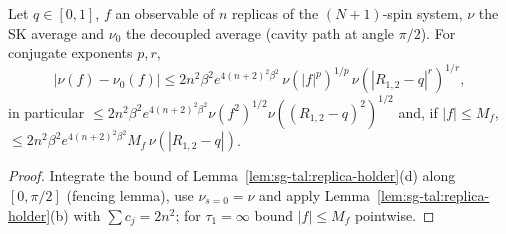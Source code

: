 \begin{theorem}
\label{thm:sg-tal:prop-181-first}
  \leanok
{}
Let $q\in[0,1]$, $f$ an observable of $n$ replicas of the $(N+1)$-spin system, $\nu$ the SK average and $\nu_0$ the decoupled average (cavity path at angle $\pi/2$).  For conjugate exponents $p,r$,
\[
|\nu(f)-\nu_0(f)|\le2n^2\beta^2e^{4(n+2)^2\beta^2}\,\nu(|f|^p)^{1/p}\,\nu(|R_{1,2}-q|^r)^{1/r},
\]
in particular $\le2n^2\beta^2e^{4(n+2)^2\beta^2}\nu(f^2)^{1/2}\nu((R_{1,2}-q)^2)^{1/2}$ and, if $|f|\le M_f$, $\le2n^2\beta^2e^{4(n+2)^2\beta^2}M_f\,\nu(|R_{1,2}-q|)$.
\end{theorem}
\begin{proof}
  \leanok
Integrate the bound of Lemma~\ref{lem:sg-tal:replica-holder}(d) along $[0,\pi/2]$ (fencing lemma), use $\nu_{s=0}=\nu$ and apply Lemma~\ref{lem:sg-tal:replica-holder}(b) with $\sum c_j=2n^2$; for $\tau_1=\infty$ bound $|f|\le M_f$ pointwise.
\end{proof}

